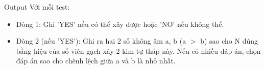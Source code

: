 Output
Với mỗi test:
\begin{itemize}
	\item Dòng 1: Ghi 'YES' nếu có thể xây được hoặc 'NO' nếu không thể.
	\item Dòng 2 (nếu 'YES'): Ghi ra hai 2 số không âm a, b (a $>$ b) sao cho N đúng bằng hiệu của số viên gạch xây 2 kim tự tháp này. Nếu có nhiều đáp án, chọn đáp án sao cho chênh lệch giữa a và b là nhỏ nhất.
\end{itemize}